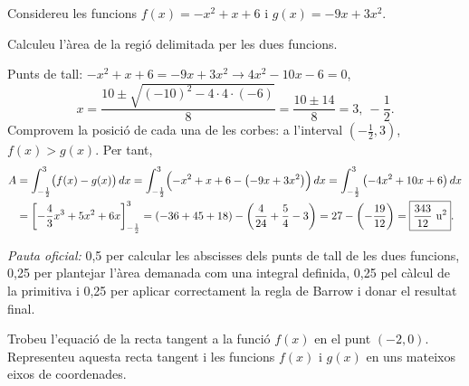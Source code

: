 Considereu les funcions $f(x)=-x^2+x+6$ i $g(x)=-9x+3x^2$.

\begin{apartats}

Calculeu l'àrea de la regió delimitada per les dues funcions.

\begin{solucio}
Punts de tall: $-x^2+x+6=-9x+3x^2\rightarrow4x^2-10x-6=0$,
\[
x=\frac{10\pm\sqrt{(-10)^2-4\cdot4\cdot(-6)}}{8}=\frac{10\pm14}{8}=3,\ -\frac12 .
\]
Comprovem la posició de cada una de les corbes: a l'interval $\left(-\frac12,3\right)$, $f(x)>g(x)$. Per tant,
\begin{align*}
A&=\int_{-\frac12}^{3}\bigl(f(x)-g(x)\bigr)\,dx=\int_{-\frac12}^{3}\Bigl(-x^2+x+6-\left(-9x+3x^2\right)\Bigr)\,dx
=\int_{-\frac12}^{3}\left(-4x^2+10x+6\right)dx\\
&=\left[-\frac43x^3+5x^2+6x\right]_{-\frac12}^{3}=(-36+45+18)-\left(\frac4{24}+\frac54-3\right)
=27-\left(-\frac{19}{12}\right)=\boxed{\frac{343}{12}\ \text{u}^2}.
\end{align*}

\textit{Pauta oficial:} 0,5 per calcular les abscisses dels punts de tall de les dues funcions, 0,25 per plantejar
l'àrea demanada com una integral definida, 0,25 pel càlcul de la primitiva i 0,25 per aplicar correctament la
regla de Barrow i donar el resultat final.
\end{solucio}

Trobeu l'equació de la recta tangent a la funció $f(x)$ en el punt $(-2,0)$. Representeu aquesta recta tangent i les
funcions $f(x)$ i $g(x)$ en uns mateixos eixos de coordenades.


\end{apartats}
